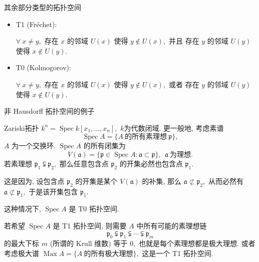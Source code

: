 
\graymode
\begin{frame}{其余部分类型的拓扑空间}

\begin{itemize}[<+->]
\item T1 (Fréchet):

$\forall~x \neq y,$ 存在 $x$ 的邻域 $U(x)$ 使得 $y \not\in U(x),$ {\color{red}并且} 存在 $y$ 的邻域 $U(y)$ 使得 $x \not \in U(y).$

\vspace{1em}

\item T0 (Kolmogorov):

$\forall~x \neq y,$ 存在 $x$ 的邻域 $U(x)$ 使得 $y \not\in U(x),$ {\color{red}或者} 存在 $y$ 的邻域 $U(y)$ 使得 $x \not\in U(y).$
\end{itemize}


\end{frame}


\begin{frame}{非 Hausdorff 拓扑空间的例子}

Zariski拓扑
\pause
$k^n = \operatorname{Spec} k[x_1, \dots, x_n],$ $k$为代数闭域. 更一般地, 考虑素谱
\[\operatorname{Spec} A = \{ A ~ \text{的所有素理想} ~ \mathfrak{p} \},\]
$A$ 为一个交换环. $\operatorname{Spec} A$ 的所有闭集为
\[V(\mathfrak{a}) = \{ \mathfrak{p} \in \operatorname{Spec} A:
\mathfrak{a} \subset \mathfrak{p} \}, ~~ \mathfrak{a} ~\text{为理想}.\]
\pause
若素理想 $\mathfrak{p}_1 \subsetneqq \mathfrak{p}_2,$ 那么任意包含点 $\mathfrak{p}_2$ 的开集必然也包含点 $\mathfrak{p}_1.$

\pause

这是因为, 设包含点 $\mathfrak{p}_2$ 的开集是某个 $V(\mathfrak{a})$ 的补集, 那么 $\mathfrak{a} \not\subset \mathfrak{p}_2,$ 从而必然有 $\mathfrak{a} \not\subset \mathfrak{p}_1,$ 于是该开集包含 $\mathfrak{p}_1.$

这种情况下, $\operatorname{Spec}A$ 是 T0 拓扑空间.

\pause
\vspace{0.5em}

若希望 $\operatorname{Spec}A$ 是 T1 拓扑空间, 则需要 $A$ 中所有可能的素理想链
\[
\mathfrak{p}_0 \subsetneqq \mathfrak{p}_1 \subsetneqq \cdots \subsetneqq \mathfrak{p}_m
\]
的最大下标 $m$ (所谓的 Krull 维数) 等于 $0,$ 也就是每个素理想都是极大理想.
\pause
或者考虑极大谱 $\operatorname{Max} A = \{ A ~ \text{的所有极大理想} \},$ 这是一个 T1 拓扑空间.


\end{frame}
\normalmode

